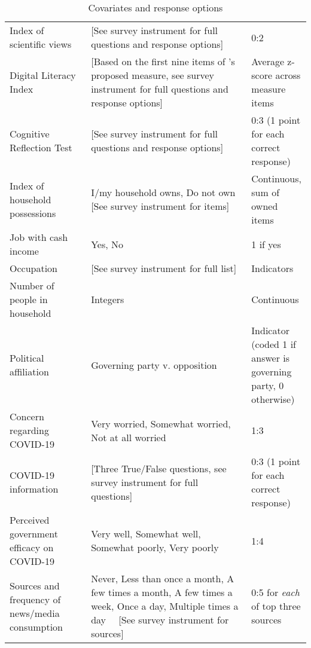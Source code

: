 \begin{table}[H]
\begin{adjustbox}{totalheight=.9\baselineskip, max width = \textwidth}
\begin{tabular}{p{0.3\linewidth}p{0.7\linewidth}p{0.25\linewidth}}
Index   of scientific views                 & [See   survey instrument for full questions and response options] & 0:2                     \\
Digital Literacy Index &  {[}Based on the first nine items of \cite{guess2020digital}'s  proposed measure, see  survey instrument for full questions and response options{]}& Average z-score across measure items\\
Cognitive Reflection Test& {[}See   survey instrument for full questions and response options{]}& 0:3 (1 point for each correct response)\\
Index of household possessions%
&
  I/my household owns, Do not own [See survey instrument for items] &
  Continuous, sum of owned items \\
Job   with cash income                      & Yes,   No                                                  & 1 if yes                \\
Occupation                                  & {[}See   survey instrument for full list{]}                & Indicators              \\
Number   of people in household             & Integers                                                   & Continuous              \\
Political affiliation & Governing party v. opposition & Indicator (coded 1 if answer is governing party, 0 otherwise)\\
Concern regarding COVID-19                  & Very   worried, Somewhat worried, Not at all worried       & 1:3                     \\
COVID-19 information & [Three True/False questions, see survey instrument for full questions] & 0:3 (1 point for each correct response)\\
Perceived government efficacy   on COVID-19 & Very   well, Somewhat well, Somewhat poorly, Very poorly   & 1:4 \\
Sources and frequency of news/media consumption &Never, Less than once a month, A few times a month, A few times a week, Once a day, Multiple times a day \ \  [See survey instrument for sources]  &  0:5 for \textit{each} of top three sources
\end{tabular} 
\end{adjustbox}
\caption{Covariates and response options}
\label{cov_long}
\end{table}